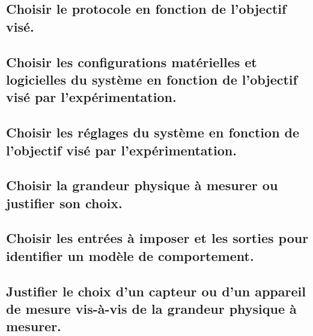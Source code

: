 \documentclass[10pt,fleqn]{book}
\begin{document}
\subsection{Choisir le protocole en fonction de l'objectif visé.} 

\begin{multicols}{2} 

\end{multicols}

\subsection{Choisir les configurations matérielles et logicielles du système en fonction de l'objectif visé par l'expérimentation.} 

\begin{multicols}{2} 

\end{multicols}

\subsection{Choisir les réglages du système en fonction de l'objectif visé par l'expérimentation.} 

\begin{multicols}{2} 

\end{multicols}

\subsection{Choisir la grandeur physique à mesurer ou justifier son choix.} 

\begin{multicols}{2} 

\end{multicols}

\subsection{Choisir les entrées à imposer et les sorties pour identifier un modèle de comportement.} 

\begin{multicols}{2} 

\end{multicols}

\subsection{Justifier le choix d’un capteur ou d’un appareil de mesure vis-à-vis de la grandeur physique à mesurer.} 
\end{document}
